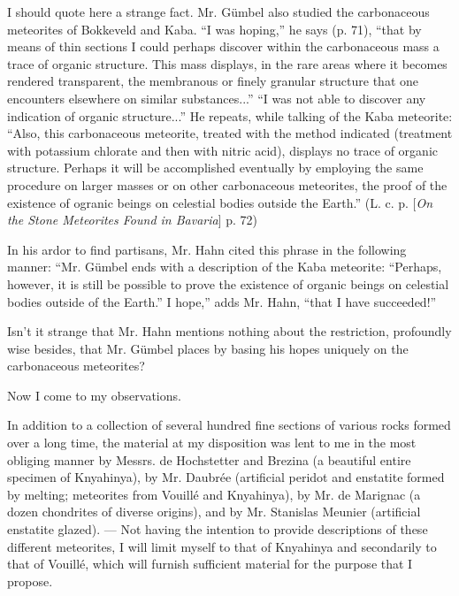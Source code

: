 \documentclass[a4paper, 12pt, oneside]{article}
\begin{document}
I should quote here a strange fact. Mr. Gümbel also studied the carbonaceous meteorites of Bokkeveld and Kaba. ``I was hoping,'' he says (p. 71), ``that by means of thin sections I could perhaps discover within the carbonaceous mass a trace of organic structure. This mass displays, in the rare areas where it becomes rendered transparent, the membranous or finely granular structure that one encounters elsewhere on similar substances...'' ``I was not able to discover any indication of organic structure...'' He repeats, while talking of the Kaba meteorite: ``Also, this carbonaceous meteorite, treated with the method indicated (treatment with potassium chlorate and then with nitric acid), displays no trace of organic structure. Perhaps it will be accomplished eventually by employing the same procedure on larger masses or on other carbonaceous meteorites, the proof of the existence of ogranic beings on celestial bodies outside the Earth.'' (L. c. p. [\emph{On the Stone Meteorites Found in Bavaria}] p. 72)

In his ardor to find partisans, Mr. Hahn cited this phrase in the following manner: ``Mr. Gümbel ends with a description of the Kaba meteorite: ``Perhaps, however, it is still be possible to prove the existence of organic beings on celestial bodies outside of the Earth.'' I hope,'' adds Mr. Hahn, ``that I have succeeded!''

Isn't it strange that Mr. Hahn mentions nothing about the restriction, profoundly wise besides, that Mr. Gümbel places by basing his hopes uniquely on the carbonaceous meteorites?

Now I come to my observations.

In addition to a collection of several hundred fine sections of various rocks formed over a long time, the material at my disposition was lent to me in the most obliging manner by Messrs. de Hochstetter and Brezina (a beautiful entire specimen of Knyahinya), by Mr. Daubrée (artificial peridot and enstatite formed by melting; meteorites from Vouillé and Knyahinya), by Mr. de Marignac (a dozen chondrites of diverse origins), and by Mr. Stanislas Meunier (artificial enstatite glazed). --- Not having the intention to provide descriptions of these different meteorites, I will limit myself to that of Knyahinya and secondarily to that of Vouillé, which will furnish sufficient material for the purpose that I propose.
\end{document}
